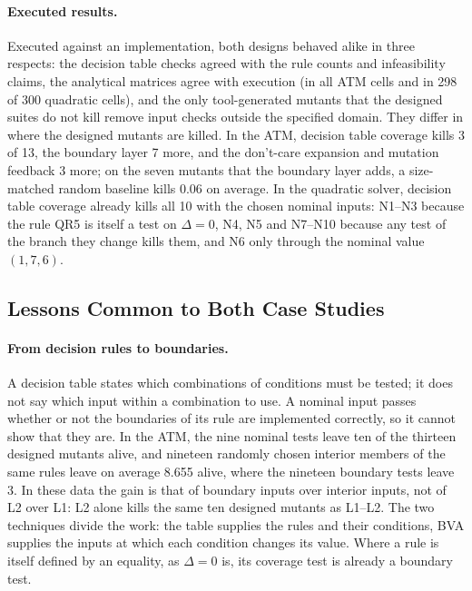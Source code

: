 \documentclass[11pt,a4paper]{article}
\begin{document}
\paragraph{Executed results.} Executed against an implementation, both
designs behaved alike in three respects: the decision table checks agreed with the rule counts and infeasibility claims, the analytical matrices
agree with execution (in all ATM cells and in 298 of 300 quadratic cells),
and the only tool-generated mutants that the designed suites do not kill
remove input checks outside the specified domain. They differ in where the
designed mutants are killed. In the ATM, decision table coverage kills 3 of
13, the boundary layer 7 more, and the don't-care expansion and mutation
feedback 3 more; on the seven mutants that the boundary layer adds, a size-matched random baseline kills 0.06 on average. In
the quadratic solver, decision table coverage already kills all 10 with the
chosen nominal inputs: N1--N3 because the rule QR5 is itself a test on \(\Delta=0\), N4, N5 and N7--N10 because any test of the branch they change kills them, and N6 only through the nominal value \((1,7,6)\).

\subsection{Lessons Common to Both Case Studies}
\label{sec:lessons}

\paragraph{From decision rules to boundaries.} A decision table states which
combinations of conditions must be tested; it does not say which input
within a combination to use. A nominal input passes whether or not the
boundaries of its rule are implemented correctly, so it cannot show that
they are. In the ATM, the nine nominal tests leave ten of the thirteen
designed mutants alive, and nineteen randomly chosen interior members of the
same rules leave on average 8.655 alive, where the nineteen boundary tests
leave 3. In these data the gain is that of boundary inputs over interior inputs, not of L2 over L1: L2 alone kills the same ten designed mutants as L1--L2. The two techniques divide the work: the table supplies the rules and their conditions, BVA supplies the inputs at which each condition changes its value. Where a rule is itself defined by an
equality, as \(\Delta=0\) is, its coverage test is already a boundary test.
\end{document}
